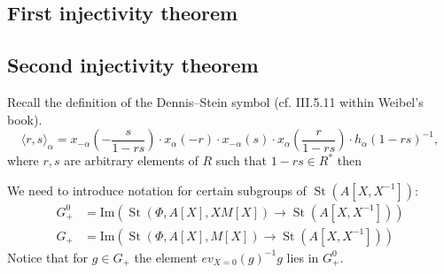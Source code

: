 \documentclass[oneside, 10pt]{amsart}
\theoremstyle{remark}
\theoremstyle{definition}
\DeclareMathOperator{\St}{St}
\begin{document}
\subsection{First injectivity theorem}
\subsection{Second injectivity theorem}

Recall the definition of the Dennis--Stein symbol (cf. III.5.11 within Weibel's book).
\begin{equation} \label{eq:dennis-stein}
 \langle r,s \rangle _ \alpha = x_{-\alpha}\left(-\frac{s}{1 - rs}\right) \cdot x_{\alpha}(-r) \cdot x_{-\alpha}(s) \cdot x_{\alpha}\left(\frac{r}{1-rs}\right) \cdot h_{\alpha}(1 - rs)^{-1},
\end{equation} 
where $r, s$ are arbitrary elements of $R$ such that $1 - rs\in R^*$ then

\begin{comment}
\[x_{\alpha}(aX^{-1}) x_{-\alpha}(mX) x_{\alpha}(-a(1+am)^{-1}X^{-1}) \cdot \{X, 1+am\} \in G_+.\]
$y := x_{\alpha}(aX^{-1}) x_{-\alpha}(mX) x_{\alpha}(-a(1+am)^{-1}X^{-1})$, 
$z = x_{-\alpha}(-m(1+am)^{-1}X) y h_{\alpha}((1+am)^{-1})$,
Using $\pi(z) = 1$ we get 
\begin{multline}z = z^{h_{ik}^{-1}(X)} = \\ x_{ji}(-m(1+am)^{-1}) x_{ij}(a) x_{ji}(m) \cdot x_{ij}(-a(1+am)^{-1})\{X, (1+am)^{-1}\} \cdot h_{ij}((1+am)^{-1}) \in G. \end{multline}
\end{comment}

We need to introduce notation for certain subgroups of $\St(A[X, X^{-1}])$:
\begin{align}
 G_+^0 & = \mathrm{Im}(\St(\Phi, A[X], XM[X]) \to \St(A[X, X^{-1}]))\\
 G_+   & = \mathrm{Im}(\St(\Phi, A[X], M[X]) \to \St(A[X, X^{-1}]))
\end{align}
Notice that for $ g\in G_+$ the element $ev_{X=0}(g)^{-1}g$ lies in $G_+^0$.
\end{document}
